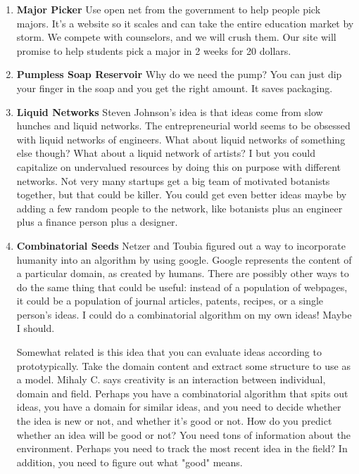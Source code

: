 \documentclass[paper=a4, fontsize=11pt]{scrartcl} %
\numberwithin{equation}{section} %
\numberwithin{figure}{section} %
\numberwithin{table}{section} %
\begin{document}
\begin{enumerate}
\item \textbf{Major Picker} Use open net from the government to help people pick majors.  It's a website so it scales and can take the entire education market by storm.  We compete with counselors, and we will crush them.  Our site will promise to help students pick a major in 2 weeks for 20 dollars.

\item \textbf{Pumpless Soap Reservoir}  Why do we need the pump?  You can just dip your finger in the soap and you get the right amount.  It saves packaging.  

\item \textbf{Liquid Networks} Steven Johnson's idea is that ideas come from slow hunches and liquid networks.  The entrepreneurial world seems to be obsessed with liquid networks of engineers.  What about liquid networks of something else though?  What about a liquid network of artists?  I but you could capitalize on undervalued resources by doing this on purpose with different networks.  Not very many startups get a big team of motivated botanists together, but that could be killer.  You could get even better ideas maybe by adding a few random people to the network, like botanists plus an engineer plus a finance person plus a designer.  

\item \textbf{Combinatorial Seeds} Netzer and Toubia figured out a way to incorporate humanity into an algorithm by using google.  Google represents the content of a particular domain, as created by humans.  There are possibly other ways to do the same thing that could be useful: instead of a population of webpages, it could be a population of journal articles, patents, recipes, or a single person's ideas.  I could do a combinatorial algorithm on my own ideas!  Maybe I should.  

Somewhat related is this idea that you can evaluate ideas according to prototypically.  Take the domain content and extract some structure to use as a model.  Mihaly C. says creativity is an interaction between individual, domain and field.  Perhaps you have a combinatorial algorithm that spits out ideas, you have a domain for similar ideas, and you need to decide whether the idea is new or not, and whether it's good or not.  How do you predict whether an idea will be good or not?  You need tons of information about the environment.  Perhaps you need to track the most recent idea in the field?  In addition, you need to figure out what "good" means.  


\end{enumerate}
\end{document}

